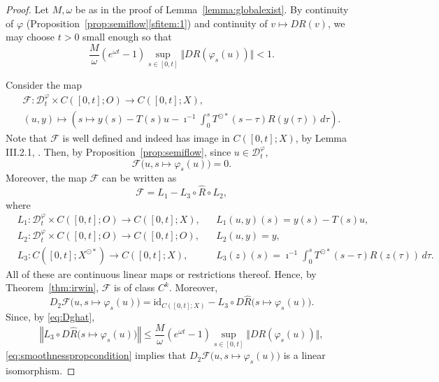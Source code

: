 \documentclass[a4paper, 12pt, oneside, reqno, notitlepage]{amsart}
\theoremstyle{plain}
\theoremstyle{definition}
\theoremstyle{remark}
\begin{document}
\begin{proof}
    Let $M, \omega$ be as in the proof of Lemma~\ref{lemma:globalexist}.
    By continuity of $\varphi$ (Proposition~\ref{prop:semiflow}\ref{sfitem:1}) and continuity of $v \mapsto DR(v)$, we may choose $t > 0$ small enough so that
    \begin{equation}
        \frac{M}{\omega} \left( e^{\omega t} - 1 \right) \sup_{s \in [0,t]} \Vert DR (\varphi_s(u)) \Vert < 1.
        \label{eq:smoothnesspropcondition}
    \end{equation}

    Consider the map
    \begin{gather*}
        \mathcal{F} : \mathcal{D}^\varphi_t \times C([0,t];O) \to  C([0,t];X), \\
        (u,y) \mapsto \left( s \mapsto y(s) -  T(s)u - \imath^{-1} \int_0^s T^{\odot *}(s-\tau) R (y(\tau)) \, d\tau \right).
    \end{gather*}
    Note that $\mathcal{F}$ is well defined and indeed has image in $C([0,t];X)$, by Lemma III.2.1, \cite{diekmann2012delay}. 
    Then, by Proposition~\ref{prop:semiflow}, since $u \in \mathcal{D}^\varphi_t$,
    \begin{displaymath}
        \mathcal{F}\big(u, s \mapsto \varphi_s(u) \big) = 0.
    \end{displaymath}
    Moreover, the map $\mathcal{F}$ can be written as
    \begin{displaymath}
        \mathcal{F} = L_1 - L_3 \circ \widehat{R} \circ L_2,
    \end{displaymath}
    where 
    \begin{align*}
        &L_1: \mathcal{D}^\varphi_t \times C([0,t];O) \to  C([0,t];X),& &L_1 (u,y) (s) = y(s) - T(s)u, \\
        &L_2 : \mathcal{D}^\varphi_t \times C([0,t];O) \to C([0,t];O), & &L_2(u,y) = y, \\
       &L_3 :C([0,t];X^{\odot *}) \to  C([0,t];X), & &L_3(z)(s) = \imath^{-1} \int_0^s T^{\odot *}(s-\tau) R(z(\tau)) \, d \tau.
    \end{align*}
    All of these are continuous linear maps or restrictions thereof.
    Hence, by Theorem~\ref{thm:irwin}, $\mathcal{F}$ is of class $C^k$.
    Moreover, 
    \begin{displaymath}
        D_2 \mathcal{F}\big(u,s \mapsto \varphi_s(u)\big) = \mathrm{id}_{C([0,t];X)} -L_3 \circ D \widehat{R} \big(s \mapsto \varphi_s(u)\big) .
    \end{displaymath}
    Since, by \eqref{eq:Dghat},
    \begin{displaymath}
        \left\Vert L_3 \circ D \widehat{R} \big(s \mapsto \varphi_s(u)\big) \right\Vert \leq \frac{M}{\omega} \left( e^{\omega t} - 1 \right) \sup_{s \in [0,t]} \Vert DR (\varphi_s(u)) \Vert,
    \end{displaymath}
    \eqref{eq:smoothnesspropcondition} implies that $D_2 \mathcal{F}\big(u,s \mapsto \varphi_s(u)\big)$ is a linear isomorphism.


\end{proof}
\end{document}
